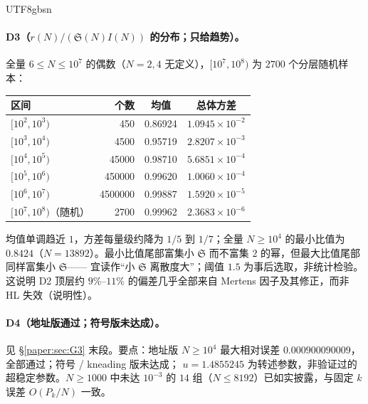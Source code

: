 \documentclass[11pt,a4paper]{article}
\newcommand{\Sing}{\mathfrak S}
\theoremstyle{plain}
\theoremstyle{definition}
\begin{document}
\begin{CJK}{UTF8}{gbsn}
\paragraph{D3（$r(N)/(\Sing(N)I(N))$ 的分布；只给趋势）。} 全量 $6\le N\le10^7$ 的偶数（$N=2,4$ 无定义），$[10^7,10^8)$ 为 $2700$ 个分层随机样本：
\begin{center}
\small
\begin{tabular}{lrcc}
\hline
区间 & 个数 & 均值 & 总体方差\\
\hline
$[10^2,10^3)$ & 450 & 0.86924 & $1.0945\times10^{-2}$\\
$[10^3,10^4)$ & 4500 & 0.95719 & $2.8207\times10^{-3}$\\
$[10^4,10^5)$ & 45000 & 0.98710 & $5.6851\times10^{-4}$\\
$[10^5,10^6)$ & 450000 & 0.99620 & $1.0060\times10^{-4}$\\
$[10^6,10^7)$ & 4500000 & 0.99887 & $1.5920\times10^{-5}$\\
$[10^7,10^8)$（随机） & 2700 & 0.99962 & $2.3683\times10^{-6}$\\
\hline
\end{tabular}
\end{center}
均值单调趋近 $1$，方差每量级约降为 $1/5$ 到 $1/7$；全量 $N\ge10^4$ 的最小比值为 $0.8424$（$N=13892$）。最小比值尾部富集小 $\Sing$ 而不富集 $2$ 的幂，但最大比值尾部同样富集小 $\Sing$——
宜读作“小 $\Sing$ 离散度大”；阈值 $1.5$ 为事后选取，非统计检验。这说明 D2 顶层约 $9\%$--$11\%$ 的偏差几乎全部来自 Mertens 因子及其修正，而非 HL 失效（说明性）。

\paragraph{D4（地址版通过；符号版未达成）。} 见 \S\ref{paper:sec:G3} 末段。要点：地址版 $N\ge10^4$ 最大相对误差 $0.000900090009$，全部通过；符号 / kneading 版未达成；
$u=1.4855245$ 为转述参数，非验证过的超稳定参数。$N\ge1000$ 中未达 $10^{-3}$ 的 $14$ 组（$N\le8192$）已如实披露，与固定 $k$ 误差 $O(P_k/N)$ 一致。


\end{CJK}
\end{document}
